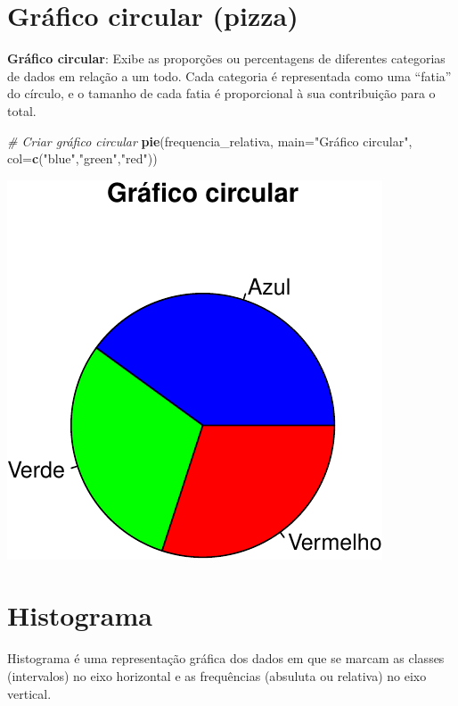 \documentclass[
]{book}
\newenvironment{Shaded}{\begin{snugshade}}{\end{snugshade}}
\newcommand{\AttributeTok}[1]{\textcolor[rgb]{0.13,0.29,0.53}{#1}}
\newcommand{\CommentTok}[1]{\textcolor[rgb]{0.56,0.35,0.01}{\textit{#1}}}
\newcommand{\FunctionTok}[1]{\textcolor[rgb]{0.13,0.29,0.53}{\textbf{#1}}}
\newcommand{\NormalTok}[1]{#1}
\newcommand{\StringTok}[1]{\textcolor[rgb]{0.31,0.60,0.02}{#1}}
\begin{document}
\section{Gráfico circular (pizza)}\label{gruxe1fico-circular-pizza}

\textbf{Gráfico circular}: Exibe as proporções ou percentagens de diferentes categorias de dados em relação a um todo. Cada categoria é representada como uma ``fatia'' do círculo, e o tamanho de cada fatia é proporcional à sua contribuição para o total.

\begin{Shaded}
\begin{Highlighting}[]
\CommentTok{\# Criar gráfico circular}
\FunctionTok{pie}\NormalTok{(frequencia\_relativa, }\AttributeTok{main=}\StringTok{"Gráfico circular"}\NormalTok{,}
  \AttributeTok{col=}\FunctionTok{c}\NormalTok{(}\StringTok{"blue"}\NormalTok{,}\StringTok{"green"}\NormalTok{,}\StringTok{"red"}\NormalTok{))}
\end{Highlighting}
\end{Shaded}

\includegraphics{meuLivro2_files/figure-latex/unnamed-chunk-112-1.pdf}

\section{Histograma}\label{histograma}

Histograma é uma representação gráfica dos dados em que se marcam as classes (intervalos) no eixo horizontal e as frequências (absuluta ou relativa) no eixo vertical.
\end{document}
